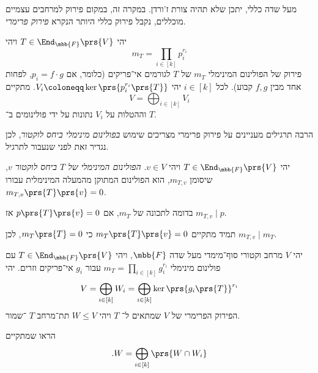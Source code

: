 \documentclass[a4paper,10pt,twoside,openany]{book}
\begin{document}
מעל שדה כללי, יתכן שלא תהיה צורת ז'ורדן. במקרה זה, במקום פירוק למרחבים עצמיים מוכללים, נקבל פירוק כללי היותר הנקרא
\emph{פירוק פרימרי}.

\begin{theorem}
יהי
$T \in \End_{\mbb{F}}\prs{V}$
ויהי
\[m_T = \prod_{i \in [k]} p_i^{r_i}\]
פירוק של הפולינום המינימלי
$m_T$
של
$T$
לגורמים אי־פריקים (כלומר, אם
$p_i = f \cdot g$,
לפחות אחד מבין
$f,g$
קבוע).
לכל
$i \in [k]$
יהי
$V_i \coloneqq \ker\prs{p_i^{r_i}\prs{T}}$.
מתקיים
\[V = \bigoplus_{i \in [k]} V_i\]
וההטלות על
$V_i$
נתונות על ידי פולינומים ב־%
$T$.
\end{theorem}

הרבה תרגילים מעניינים על פירוק פרימרי מצריכים שימוש
\emph{בפולינום מינימלי ביחס לוקטור},
לכן נגדיר זאת לפני שנעבור לתרגיל.

\begin{definition}
יהי
$T \in \End_{\mbb{F}}\prs{V}$
ויהי
$v \in V$.
\emph{הפולינום המינימלי של
$T$
ביחס לוקטור
$v$},
שיסומן
$m_{T,v}$,
הוא הפולינום המתוקן מהמעלה המינימלית עבורו
$m_{T,v}\prs{T}\prs{v} = 0$.
\end{definition}

\begin{fact}
בדומה לתכונה של
$m_T$,
אם
$p\prs{T}\prs{v} = 0$
אז
$m_{T,v} \mid p$.
\end{fact}

\begin{corollary}
תמיד מתקיים
$m_T\prs{T}\prs{v} = 0$
כי
$m_T\prs{T} = 0$,
לכן
$m_{T,v} \mid m_T$.
\end{corollary}

\begin{exercisechap}
יהי
$V$
מרחב וקטורי סוף־מימדי מעל שדה
$\mbb{F}$,
ויהי
$T \in \End_{\mbb{F}}\prs{V}$
עם פולינום מינימלי
$m_T = \prod_{i \in [k]} g_i^{r_i}$
עבור
$g_i$
אי־פריקים וזרים.
יהי
\[V = \bigoplus_{i \in [k]} W_i = \bigoplus_{i \in [k]} \ker\prs{g_i\prs{T}}^{r_i}\]
הפירוק הפרימרי של
$V$
שמתאים ל־%
$T$
ויהי
$W \leq V$
תת־מרחב
$T$%
־שמור.

הראו שמתקיים
\[\text{.} W = \bigoplus_{i \in [k]} \prs{W \cap W_i}\]
\end{exercisechap}
\end{document}
